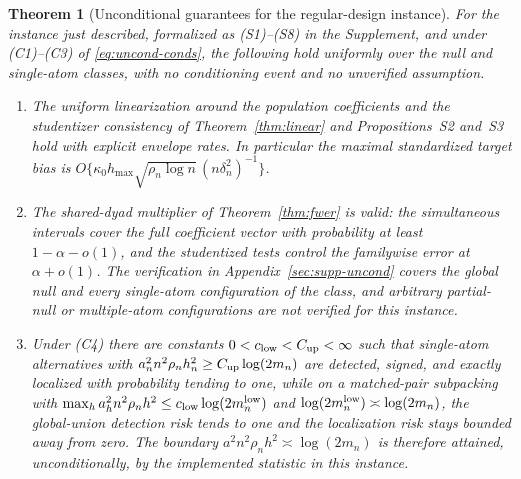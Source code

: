 \documentclass[11pt]{article}
\newtheorem{theorem}{Theorem}[section]
\theoremstyle{definition}
\newcommand{\1}{\mathbf 1}\newcommand{\op}{\operatorname}
\begin{document}
\begin{theorem}[Unconditional guarantees for the regular-design instance]
\label{app:thm-uncond}
For the instance just described, formalized as \textup{(S1)--(S8)} in the
Supplement, and under \textup{(C1)--(C3)} of \eqref{eq:uncond-conds}, the
following hold uniformly over the null and single-atom classes, with no
conditioning event and no unverified assumption.
\begin{enumerate}[label=\textup{(\alph*)},leftmargin=2em,itemsep=2pt]
\item The uniform linearization around the population coefficients and the
studentizer consistency of Theorem~\ref{thm:linear} and
Propositions~S2 and~S3 hold with explicit envelope
rates.  In particular the maximal standardized target bias is
$O\{\kappa_0h_{\max}\sqrt{\rho_n\log n}\,(n\delta_n^2)^{-1}\}$.
\item The shared-dyad multiplier of Theorem~\ref{thm:fwer} is valid: the
simultaneous intervals cover the full coefficient vector with probability at
least $1-\alpha-o(1)$, and the studentized tests control the familywise error at
$\alpha+o(1)$.  The verification in Appendix~\ref{sec:supp-uncond} covers the global null
and every single-atom configuration of the class, and arbitrary partial-null or
multiple-atom configurations are not verified for this instance.
\item Under \textup{(C4)} there are constants $0<c_{\rm low}<C_{\rm up}<\infty$
such that single-atom alternatives with
$a_n^2n^2\rho_nh_n^2\ge C_{\rm up}\log(2m_n)$ are detected, signed, and exactly
localized with probability tending to one, while on a matched-pair subpacking
with $\max_ha_h^2n^2\rho_nh^2\le c_{\rm low}\log(2m_n^{\rm low})$ and
$\log(2m_n^{\rm low})\asymp\log(2m_n)$, the global-union detection risk tends to
one and the localization risk stays bounded away from zero.  The boundary
$a^2n^2\rho_nh^2\asymp\log(2m_n)$ is therefore attained, unconditionally, by the
implemented statistic in this instance.
\end{enumerate}
\end{theorem}
\end{document}

